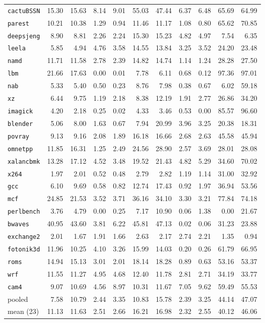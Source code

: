 \documentclass[10pt,a4paper]{article}
\newcommand{\ct}[1]{\texttt{#1}}
\begin{document}
{\begin{longtable}{@{}lrrrrrrrrrr@{}}
\bottomrule
\endlastfoot
\ct{cactuBSSN} & 15.30 & 15.63 & 8.14 & 9.01 & 55.03 & 47.44 & 6.37 & 6.48 & 65.69 & 64.99 \\
\ct{parest} & 10.21 & 10.38 & 1.29 & 0.94 & 11.46 & 11.17 & 1.08 & 0.80 & 65.62 & 70.85 \\
\ct{deepsjeng} & 8.90 & 8.81 & 2.26 & 2.24 & 15.30 & 15.23 & 4.82 & 4.97 & 7.54 & 6.35 \\
\ct{leela} & 5.85 & 4.94 & 4.76 & 3.58 & 14.55 & 13.84 & 3.25 & 3.52 & 24.20 & 23.48 \\
\ct{namd} & 11.71 & 11.58 & 2.78 & 2.39 & 14.82 & 14.74 & 1.14 & 1.24 & 28.28 & 27.50 \\
\ct{lbm} & 21.66 & 17.63 & 0.00 & 0.01 & 7.78 & 6.11 & 0.68 & 0.12 & 97.36 & 97.01 \\
\ct{nab} & 5.33 & 5.40 & 0.50 & 0.23 & 8.76 & 7.98 & 0.38 & 0.67 & 6.02 & 59.18 \\
\ct{xz} & 6.44 & 9.75 & 1.19 & 2.18 & 8.38 & 12.19 & 1.91 & 2.77 & 26.86 & 34.20 \\
\ct{imagick} & 4.20 & 2.18 & 0.25 & 0.02 & 4.33 & 3.46 & 0.53 & 0.00 & 85.57 & 96.60 \\
\ct{blender} & 5.06 & 8.00 & 1.63 & 0.67 & 7.94 & 20.99 & 3.96 & 3.25 & 20.38 & 18.31 \\
\ct{povray} & 9.13 & 9.16 & 2.08 & 1.89 & 16.18 & 16.66 & 2.68 & 2.63 & 45.58 & 45.94 \\
\ct{omnetpp} & 11.85 & 16.31 & 1.25 & 2.49 & 24.56 & 28.90 & 2.57 & 3.69 & 28.01 & 28.08 \\
\ct{xalancbmk} & 13.28 & 17.12 & 4.52 & 3.48 & 19.52 & 21.43 & 4.82 & 5.29 & 34.60 & 70.02 \\
\ct{x264} & 1.97 & 2.01 & 0.52 & 0.48 & 2.79 & 2.82 & 1.19 & 1.14 & 31.00 & 32.92 \\
\ct{gcc} & 6.10 & 9.69 & 0.58 & 0.82 & 12.74 & 17.43 & 0.92 & 1.97 & 36.94 & 53.56 \\
\ct{mcf} & 24.85 & 21.53 & 3.52 & 3.71 & 36.16 & 34.10 & 3.30 & 3.21 & 77.84 & 74.18 \\
\ct{perlbench} & 3.76 & 4.79 & 0.00 & 0.25 & 7.17 & 10.90 & 0.06 & 1.38 & 0.00 & 21.67 \\
\ct{bwaves} & 40.95 & 43.60 & 3.81 & 6.22 & 45.81 & 47.13 & 0.02 & 0.06 & 31.23 & 23.88 \\
\ct{exchange2} & 2.01 & 1.67 & 1.91 & 1.66 & 2.63 & 2.17 & 2.74 & 2.21 & 1.35 & 0.94 \\
\ct{fotonik3d} & 11.96 & 10.25 & 4.10 & 3.26 & 15.99 & 14.03 & 0.20 & 0.26 & 61.79 & 66.95 \\
\ct{roms} & 14.94 & 15.13 & 3.01 & 2.01 & 18.14 & 18.28 & 0.89 & 0.63 & 53.16 & 53.37 \\
\ct{wrf} & 11.55 & 11.27 & 4.95 & 4.68 & 12.40 & 11.78 & 2.81 & 2.71 & 34.19 & 33.77 \\
\ct{cam4} & 9.07 & 10.69 & 4.56 & 8.97 & 10.31 & 11.67 & 7.05 & 9.62 & 59.49 & 55.53 \\
\midrule
pooled & 7.58 & 10.79 & 2.44 & 3.35 & 10.83 & 15.78 & 2.39 & 3.25 & 44.14 & 47.07 \\
mean (23) & 11.13 & 11.63 & 2.51 & 2.66 & 16.21 & 16.98 & 2.32 & 2.55 & 40.12 & 46.06 \\
\end{longtable}
}
\end{document}
